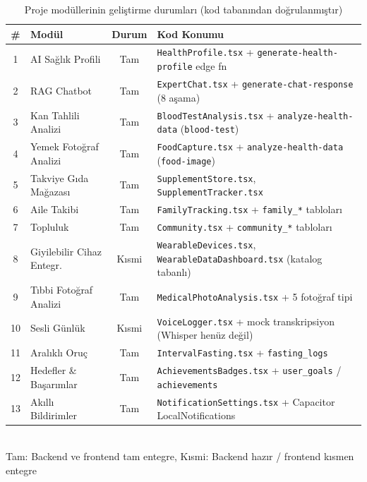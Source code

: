 \begin{table}[H]
\centering
\caption{Proje modüllerinin geliştirme durumları (kod tabanından doğrulanmıştır)}
\label{tab:module_status}
\small
\begin{tabular}{|c|l|c|p{}|}
\hline
\textbf{\#} & \textbf{Modül} & \textbf{Durum} & \textbf{Kod Konumu} \\
\hline
1  & AI Sağlık Profili         & Tam     & \texttt{HealthProfile.tsx} + \texttt{generate-health-profile} edge fn \\
2  & RAG Chatbot               & Tam     & \texttt{ExpertChat.tsx} + \texttt{generate-chat-response} (8 aşama) \\
3  & Kan Tahlili Analizi       & Tam     & \texttt{BloodTestAnalysis.tsx} + \texttt{analyze-health-data} (\texttt{blood-test}) \\
4  & Yemek Fotoğraf Analizi    & Tam     & \texttt{FoodCapture.tsx} + \texttt{analyze-health-data} (\texttt{food-image}) \\
5  & Takviye Gıda Mağazası     & Tam     & \texttt{SupplementStore.tsx}, \texttt{SupplementTracker.tsx} \\
6  & Aile Takibi               & Tam     & \texttt{FamilyTracking.tsx} + \texttt{family\_*} tabloları \\
7  & Topluluk                  & Tam     & \texttt{Community.tsx} + \texttt{community\_*} tabloları \\
8  & Giyilebilir Cihaz Entegr. & Kısmi   & \texttt{WearableDevices.tsx}, \texttt{WearableDataDashboard.tsx} (katalog tabanlı) \\
9  & Tıbbi Fotoğraf Analizi    & Tam     & \texttt{MedicalPhotoAnalysis.tsx} + 5 fotoğraf tipi \\
10 & Sesli Günlük              & Kısmi   & \texttt{VoiceLogger.tsx} + mock transkripsiyon (Whisper henüz değil) \\
11 & Aralıklı Oruç             & Tam     & \texttt{IntervalFasting.tsx} + \texttt{fasting\_logs} \\
12 & Hedefler \& Başarımlar    & Tam     & \texttt{AchievementsBadges.tsx} + \texttt{user\_goals} / \texttt{achievements} \\
13 & Akıllı Bildirimler        & Tam     & \texttt{NotificationSettings.tsx} + Capacitor LocalNotifications \\
\hline
\end{tabular}
\\[4pt]
\footnotesize{Tam: Backend ve frontend tam entegre, Kısmi: Backend hazır / frontend kısmen entegre}
\end{table}

